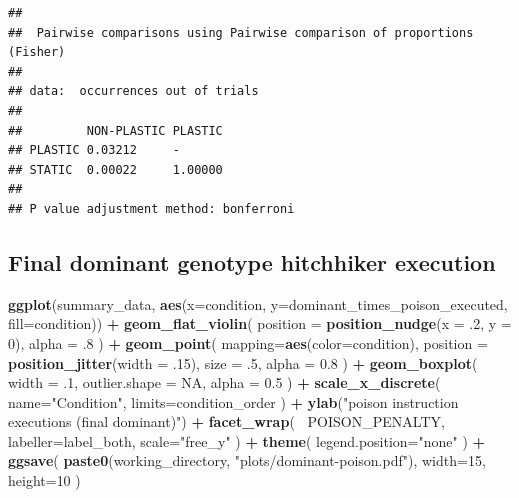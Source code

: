\documentclass[]{book}
\newenvironment{Shaded}{\begin{snugshade}}{\end{snugshade}}
\newcommand{\DataTypeTok}[1]{\textcolor[rgb]{0.13,0.29,0.53}{#1}}
\newcommand{\DecValTok}[1]{\textcolor[rgb]{0.00,0.00,0.81}{#1}}
\newcommand{\FloatTok}[1]{\textcolor[rgb]{0.00,0.00,0.81}{#1}}
\newcommand{\KeywordTok}[1]{\textcolor[rgb]{0.13,0.29,0.53}{\textbf{#1}}}
\newcommand{\NormalTok}[1]{#1}
\newcommand{\OperatorTok}[1]{\textcolor[rgb]{0.81,0.36,0.00}{\textbf{#1}}}
\newcommand{\OtherTok}[1]{\textcolor[rgb]{0.56,0.35,0.01}{#1}}
\newcommand{\StringTok}[1]{\textcolor[rgb]{0.31,0.60,0.02}{#1}}
\begin{document}
\begin{verbatim}
## 
##  Pairwise comparisons using Pairwise comparison of proportions (Fisher) 
## 
## data:  occurrences out of trials 
## 
##         NON-PLASTIC PLASTIC
## PLASTIC 0.03212     -      
## STATIC  0.00022     1.00000
## 
## P value adjustment method: bonferroni
\end{verbatim}

\hypertarget{final-dominant-genotype-hitchhiker-execution}{%
\subsection{Final dominant genotype hitchhiker execution}\label{final-dominant-genotype-hitchhiker-execution}}

\begin{Shaded}
\begin{Highlighting}[]
\KeywordTok{ggplot}\NormalTok{(summary_data, }\KeywordTok{aes}\NormalTok{(}\DataTypeTok{x=}\NormalTok{condition, }\DataTypeTok{y=}\NormalTok{dominant_times_poison_executed, }\DataTypeTok{fill=}\NormalTok{condition)) }\OperatorTok{+}
\StringTok{  }\KeywordTok{geom_flat_violin}\NormalTok{(}
    \DataTypeTok{position =} \KeywordTok{position_nudge}\NormalTok{(}\DataTypeTok{x =} \FloatTok{.2}\NormalTok{, }\DataTypeTok{y =} \DecValTok{0}\NormalTok{),}
    \DataTypeTok{alpha =} \FloatTok{.8}
\NormalTok{  ) }\OperatorTok{+}
\StringTok{  }\KeywordTok{geom_point}\NormalTok{(}
    \DataTypeTok{mapping=}\KeywordTok{aes}\NormalTok{(}\DataTypeTok{color=}\NormalTok{condition),}
    \DataTypeTok{position =} \KeywordTok{position_jitter}\NormalTok{(}\DataTypeTok{width =} \FloatTok{.15}\NormalTok{),}
    \DataTypeTok{size =} \FloatTok{.5}\NormalTok{,}
    \DataTypeTok{alpha =} \FloatTok{0.8}
\NormalTok{  ) }\OperatorTok{+}
\StringTok{  }\KeywordTok{geom_boxplot}\NormalTok{(}
    \DataTypeTok{width =} \FloatTok{.1}\NormalTok{,}
    \DataTypeTok{outlier.shape =} \OtherTok{NA}\NormalTok{,}
    \DataTypeTok{alpha =} \FloatTok{0.5}
\NormalTok{  ) }\OperatorTok{+}
\StringTok{  }\KeywordTok{scale_x_discrete}\NormalTok{(}
    \DataTypeTok{name=}\StringTok{"Condition"}\NormalTok{,}
    \DataTypeTok{limits=}\NormalTok{condition_order}
\NormalTok{  ) }\OperatorTok{+}
\StringTok{  }\KeywordTok{ylab}\NormalTok{(}\StringTok{"poison instruction executions (final dominant)"}\NormalTok{) }\OperatorTok{+}
\StringTok{  }\KeywordTok{facet_wrap}\NormalTok{(}
    \OperatorTok{~}\NormalTok{POISON_PENALTY,}
    \DataTypeTok{labeller=}\NormalTok{label_both,}
    \DataTypeTok{scale=}\StringTok{"free_y"}
\NormalTok{  ) }\OperatorTok{+}
\StringTok{  }\KeywordTok{theme}\NormalTok{(}
    \DataTypeTok{legend.position=}\StringTok{"none"}
\NormalTok{  ) }\OperatorTok{+}
\StringTok{  }\KeywordTok{ggsave}\NormalTok{(}
    \KeywordTok{paste0}\NormalTok{(working_directory, }\StringTok{"plots/dominant-poison.pdf"}\NormalTok{),}
    \DataTypeTok{width=}\DecValTok{15}\NormalTok{,}
    \DataTypeTok{height=}\DecValTok{10}
\NormalTok{  )}
\end{Highlighting}
\end{Shaded}
\end{document}
